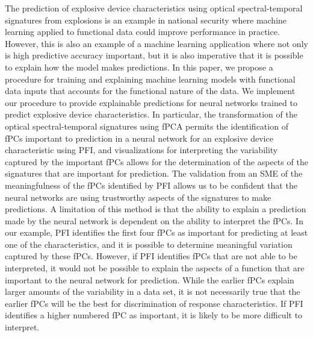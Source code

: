 \documentclass[letterpaper]{article}
\begin{document}
The prediction of explosive device characteristics using optical spectral-temporal signatures from explosions is an example in national security where machine learning applied to functional data could improve performance in practice. However, this is also an example of a machine learning application where not only is high predictive accuracy important, but it is also imperative that it is possible to explain how the model makes predictions. In this paper, we propose a procedure for training and explaining machine learning models with functional data inputs that accounts for the functional nature of the data. We implement our procedure to provide explainable predictions for neural networks trained to predict explosive device characteristics. In particular, the transformation of the optical spectral-temporal signatures using fPCA permits the identification of fPCs important to prediction in a neural network for an explosive device characteristic using PFI, and visualizations for interpreting the variability captured by the important fPCs allows for the determination of the aspects of the signatures that are important for prediction. The validation from an SME of the meaningfulness of the fPCs identified by PFI allows us to be confident that the neural networks are using trustworthy aspects of the signatures to make predictions.  A limitation of this method is that the ability to explain a prediction made by the neural network is dependent on the ability to interpret the fPCs. In our example, PFI identifies the first four fPCs as important for predicting at least one of the characteristics, and it is possible to determine meaningful variation captured by these fPCs. However, if PFI identifies fPCs that are not able to be interpreted, it would not be possible to explain the aspects of a function that are important to the neural network for prediction. While the earlier fPCs explain larger amounts of the variability in a data set, it is not necessarily true that the earlier fPCs will be the best for discrimination of response characteristics. If PFI identifies a higher numbered fPC as important, it is likely to be more difficult to interpret.
\end{document}
